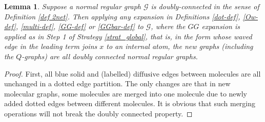 \documentclass{article}
\newcommand{\1}{\mathds{1}}
\numberwithin{equation}{section}
\newcommand{\al}{\alpha}
\renewcommand{\cal}{\mathcal}
\newcommand{\dashed}{\text{diffusive}}
\theoremstyle{plain} %
\newtheorem{lemma}[theorem]{Lemma}
\theoremstyle{remark}
\begin{document}
\begin{lemma}\label{lem localgood}
Suppose a normal regular graph $\cal G$ %
is doubly-connected in the sense of Definition \ref{def 2net}. Then applying any expansion in Definitions \ref{dot-def}, \ref{Ow-def}, \ref{multi-def}, \ref{GG-def} or \ref{GGbar-def} to $\cal G$, where the $GG$ expansion is applied as in Step 1 of Strategy \ref{strat_global}, that is, in the form whose waved edge in the leading term joins $x$ to an internal atom, the new graphs (including the $Q$-graphs) are all doubly connected normal regular graphs. %
 \end{lemma}
 \begin{proof}
First, all blue solid and (labelled) $\dashed$ edges between molecules are all unchanged in a dotted edge partition. The only changes are that in new molecular graphs, some molecules are merged into one molecule due to newly added dotted edges between different molecules. It is obvious that such merging operations will not break the doubly connected property. 


\end{proof}
\end{document}
